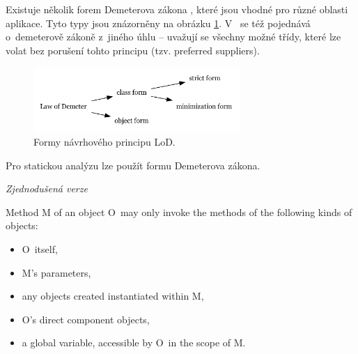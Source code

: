 
Existuje několik forem Demeterova zákona \cite{35588}, které jsou vhodné pro různé oblasti aplikace. Tyto typy jsou znázorněny na obrázku \ref{demeter_law_types}. V~\cite{35588} se též pojednává o~demeterově zákoně z~jiného úhlu -- uvažují se všechny možné třídy, které lze volat bez porušení tohto principu (tzv. preferred suppliers).

\begin{figure}[h!]
  \centering
  \includegraphics[width=0.7\textwidth]{./graphs/demeter_law_types.png}
  \caption{Formy návrhového principu LoD.\label{demeter_law_types}}
\end{figure}

Pro statickou analýzu lze použít  formu Demeterova zákona.


\emph{Zjednodušená verze \cite{wiki:lod}}

Method M of an object O~may only invoke the methods of the following kinds of objects:

\begin{itemize}
\item O~itself,
\item M's parameters,
\item any objects created instantiated within M,
\item O's direct component objects,
\item a global variable, accessible by O~in the scope of M.
\end{itemize}

